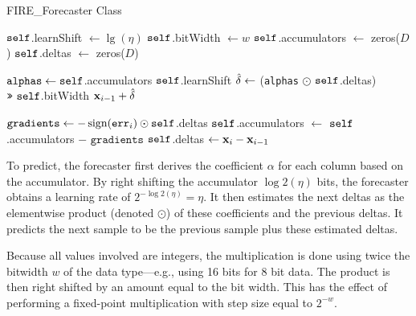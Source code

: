 
\begin{algorithm}[h]
\caption{FIRE\_Forecaster Class} \label{algo:xff}
\begin{algorithmic}[1]

 \label{line:xffCtor}
\State $\texttt{self}$.learnShift $\leftarrow \lg(\eta)$
\State $\texttt{self}$.bitWidth $\leftarrow w$ 
\State $\texttt{self}$.accumulators $\leftarrow $ zeros($D$) \label{line:counter}
\State $\texttt{self}$.deltas $\leftarrow $ zeros($D$) \label{line:deltas}
\EndFunction

 \label{line:xffPredict}
\State $\texttt{alphas} \leftarrow \texttt{self}$.accumulators \rshift $\texttt{self}$.learnShift
\State $\hat{\mathbf{\delta}} \leftarrow$ (\texttt{alphas} $\odot$ $\texttt{self}$.deltas) $\texttt{>>}\text{ } \texttt{self}$.bitWidth
\RETURN $\mathbf{x}_{i-1} + \hat{\mathbf{\delta}}$
\EndFunction

 \label{line:xffTrain}
\State $\texttt{gradients} \leftarrow {-\operatorname{sign}(\texttt{err}_i)} \odot \texttt{self}$.deltas
\State $\texttt{self}$.accumulators $\leftarrow$ $\texttt{self}$.accumulators $-$ $\texttt{gradients}$
\State $\texttt{self}$.deltas $\leftarrow \mathbf{x}_{i} - \mathbf{x}_{i-1}$
\EndFunction

\end{algorithmic}
\end{algorithm}


To predict, the forecaster first derives the coefficient $\alpha$ for each column based on the accumulator. By right shifting the accumulator $\log2(\eta)$ bits, the forecaster obtains a learning rate of $2^{-\log2(\eta)} = \eta$. It then estimates the next deltas as the elementwise product (denoted $\odot$) of these coefficients and the previous deltas. It predicts the next sample to be the previous sample plus these estimated deltas.

Because all values involved are integers, the multiplication is done using twice the bitwidth $w$ of the data type---e.g., using 16 bits for 8 bit data. The product is then right shifted by an amount equal to the bit width. This has the effect of performing a fixed-point multiplication with step size equal to $2^{-w}$.

